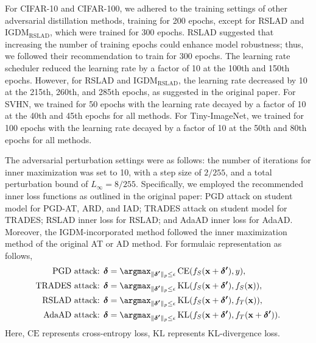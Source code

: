 \documentclass{article} %
\begin{document}
For CIFAR-10 and CIFAR-100, we adhered to the training settings of other adversarial distillation methods, training for 200 epochs, except for RSLAD and IGDM$_{\text{RSLAD}}$, which were trained for 300 epochs. 
RSLAD suggested that increasing the number of training epochs could enhance model robustness; thus, we followed their recommendation to train for 300 epochs.
The learning rate scheduler reduced the learning rate by a factor of 10 at the 100th and 150th epochs. However, for RSLAD and IGDM$_{\text{RSLAD}}$, the learning rate decreased by 10 at the 215th, 260th, and 285th epochs, as suggested in the original paper. 
For SVHN, we trained for 50 epochs with the learning rate decayed by a factor of 10 at the 40th and 45th epochs for all methods. For Tiny-ImageNet, we trained for 100 epochs with the learning rate decayed by a factor of 10 at the 50th and 80th epochs for all methods.


The adversarial perturbation settings were as follows: the number of iterations for inner maximization was set to 10, with a step size of $2/255$, and a total perturbation bound of $L_\infty = 8/255$. 
Specifically, we employed the recommended inner loss functions as outlined in the original paper: PGD attack on student model for PGD-AT, ARD, and IAD; TRADES attack on student model for TRADES; RSLAD inner loss for RSLAD; and AdaAD inner loss for AdaAD.
Moreover, the IGDM-incorporated method followed the inner maximization method of the original AT or AD method.
For formulaic representation as follows,
\begin{align}
    \text{PGD attack: } & \boldsymbol{\delta} = \argmax_{ \| \boldsymbol{\delta'} \|_p \leq \epsilon} \operatorname{CE} (f_S  (\mathbf{x}+\boldsymbol{\delta'}), y), \\
    \text{TRADES attack: } & \boldsymbol{\delta} = \argmax_{ \| \boldsymbol{\delta'} \|_p \leq \epsilon} \operatorname{KL} (f_S  (\mathbf{x}+\boldsymbol{\delta'}), f_S  (\mathbf{x})), \\
    \text{RSLAD attack: } & \boldsymbol{\delta} = \argmax_{ \| \boldsymbol{\delta'} \|_p \leq \epsilon} \operatorname{KL} (f_S  (\mathbf{x}+\boldsymbol{\delta'}), f_T  (\mathbf{x})), \\
    \text{AdaAD attack: } & \boldsymbol{\delta} = \argmax_{ \| \boldsymbol{\delta'} \|_p \leq \epsilon} \operatorname{KL} (f_S  (\mathbf{x}+\boldsymbol{\delta'}), f_T  (\mathbf{x} +\boldsymbol{\delta'})).
\end{align}
Here, $\text{CE}$ represents cross-entropy loss, $\text{KL}$ represents KL-divergence loss.
\end{document}
